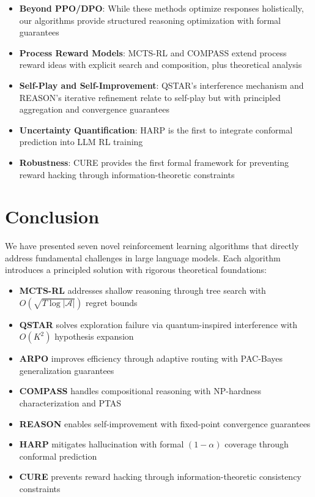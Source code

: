 \documentclass[11pt,a4paper]{article}
\newcommand{\calA}{\mathcal{A}}
\begin{document}
\begin{itemize}
    \item \textbf{Beyond PPO/DPO}: While these methods optimize responses holistically, our algorithms provide structured reasoning optimization with formal guarantees
    \item \textbf{Process Reward Models}: MCTS-RL and COMPASS extend process reward ideas with explicit search and composition, plus theoretical analysis
    \item \textbf{Self-Play and Self-Improvement}: QSTAR's interference mechanism and REASON's iterative refinement relate to self-play but with principled aggregation and convergence guarantees
    \item \textbf{Uncertainty Quantification}: HARP is the first to integrate conformal prediction into LLM RL training
    \item \textbf{Robustness}: CURE provides the first formal framework for preventing reward hacking through information-theoretic constraints
\end{itemize}

\section{Conclusion}

We have presented seven novel reinforcement learning algorithms that directly address fundamental challenges in large language models. Each algorithm introduces a principled solution with rigorous theoretical foundations:

\begin{itemize}
    \item \textbf{MCTS-RL} addresses shallow reasoning through tree search with $O(\sqrt{T\log|\calA|})$ regret bounds
    \item \textbf{QSTAR} solves exploration failure via quantum-inspired interference with $O(K^2)$ hypothesis expansion
    \item \textbf{ARPO} improves efficiency through adaptive routing with PAC-Bayes generalization guarantees
    \item \textbf{COMPASS} handles compositional reasoning with NP-hardness characterization and PTAS
    \item \textbf{REASON} enables self-improvement with fixed-point convergence guarantees
    \item \textbf{HARP} mitigates hallucination with formal $(1-\alpha)$ coverage through conformal prediction
    \item \textbf{CURE} prevents reward hacking through information-theoretic consistency constraints
\end{itemize}
\end{document}
